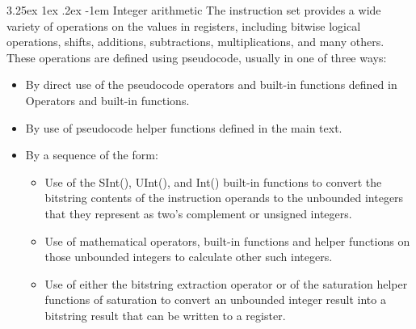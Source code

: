 \documentclass[11pt]{report}
\makeatletter
\renewcommand\paragraph{\@startsection{paragraph}{5}{\z@}%
	{3.25ex \@plus1ex \@minus.2ex}%
	{-1em}%
	{\normalfont\normalsize\bfseries}}
\makeatother
\begin{document}
		\paragraph{Integer arithmetic} The instruction set provides a wide variety of operations on the values in registers, including bitwise logical operations, shifts, additions, subtractions, multiplications, and many others. These operations are defined using pseudocode, usually in one of three ways:
		\begin{itemize}
			\item By direct use of the pseudocode operators and built-in functions defined in Operators and built-in functions.
			\item By use of pseudocode helper functions defined in the main text.
			\item By a sequence of the form:
			\begin{itemize}
				\item Use of the SInt(), UInt(), and Int() built-in functions to convert the bitstring contents of the instruction operands to the unbounded integers that they represent as two's complement or unsigned integers.
				\item Use of mathematical operators, built-in functions and helper functions on those unbounded integers to calculate other such integers.
				\item Use of either the bitstring extraction operator or of the saturation helper functions of saturation to convert an unbounded integer result into a bitstring result that can be written to a register.
			\end{itemize}
		\end{itemize}
		
\end{document}

